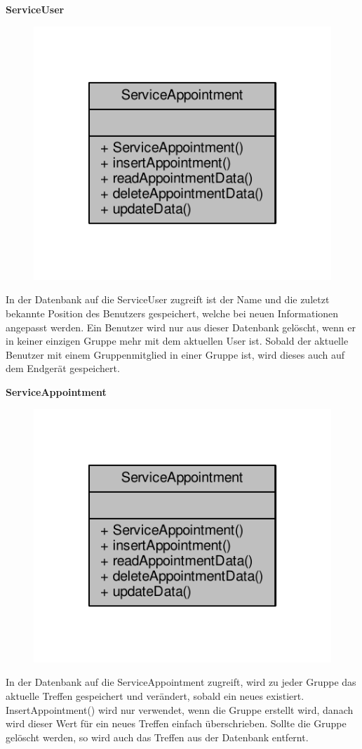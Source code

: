 \textbf{ServiceUser}
\begin{figure}[H]
	\includegraphics[scale = 1]{res/umlClasses/service_appointment__coll__graph.pdf}
	\centering
\end{figure}
In der Datenbank auf die ServiceUser zugreift ist der Name und die zuletzt bekannte Position des Benutzers gespeichert, welche bei neuen Informationen angepasst werden. 
Ein Benutzer wird nur aus dieser Datenbank gelöscht, wenn er in keiner einzigen Gruppe mehr mit dem aktuellen User ist.
Sobald der aktuelle Benutzer mit einem Gruppenmitglied in einer Gruppe ist, wird dieses auch auf dem Endgerät gespeichert.

\textbf{ServiceAppointment}
\begin{figure}[H]
	\includegraphics[scale = 1]{res/umlClasses/service_appointment__coll__graph.pdf}
	\centering
\end{figure}
In der Datenbank auf die ServiceAppointment zugreift, wird zu jeder Gruppe das aktuelle Treffen gespeichert und verändert, sobald ein neues existiert. InsertAppointment() wird nur verwendet, wenn die Gruppe erstellt wird, danach wird dieser Wert für ein neues Treffen einfach überschrieben.
Sollte die Gruppe gelöscht werden, so wird auch das Treffen aus der Datenbank entfernt.

